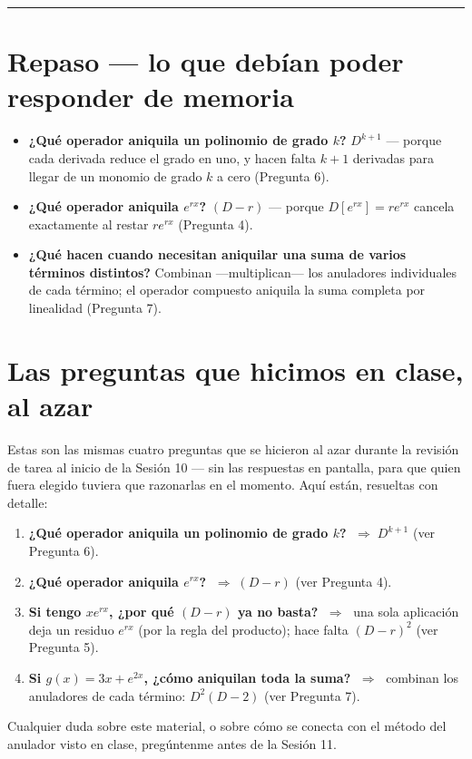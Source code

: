\documentclass[11pt]{article}
\begin{document}
\vspace{0.4em}
\hrule
\vspace{0.8em}

\section*{Repaso — lo que debían poder responder de memoria}

\begin{memoria}
\begin{itemize}[itemsep=0.4em]
  \item \textbf{¿Qué operador aniquila un polinomio de grado $k$?} $D^{k+1}$ — porque cada derivada reduce el grado en uno, y hacen falta $k+1$ derivadas para llegar de un monomio de grado $k$ a cero (Pregunta 6).
  \item \textbf{¿Qué operador aniquila $e^{rx}$?} $(D-r)$ — porque $D[e^{rx}]=re^{rx}$ cancela exactamente al restar $re^{rx}$ (Pregunta 4).
  \item \textbf{¿Qué hacen cuando necesitan aniquilar una suma de varios términos distintos?} Combinan —multiplican— los anuladores individuales de cada término; el operador compuesto aniquila la suma completa por linealidad (Pregunta 7).
\end{itemize}
\end{memoria}

\section*{Las preguntas que hicimos en clase, al azar}

Estas son las mismas cuatro preguntas que se hicieron al azar durante la revisión de tarea al inicio de la Sesión 10 — sin las respuestas en pantalla, para que quien fuera elegido tuviera que razonarlas en el momento. Aquí están, resueltas con detalle:

\begin{clase}
\begin{enumerate}[itemsep=0.6em, leftmargin=1.6em]
  \item \textbf{¿Qué operador aniquila un polinomio de grado $k$?} $\;\Rightarrow\; D^{k+1}$ (ver Pregunta 6).
  \item \textbf{¿Qué operador aniquila $e^{rx}$?} $\;\Rightarrow\; (D-r)$ (ver Pregunta 4).
  \item \textbf{Si tengo $xe^{rx}$, ¿por qué $(D-r)$ ya no basta?} $\;\Rightarrow\;$ una sola aplicación deja un residuo $e^{rx}$ (por la regla del producto); hace falta $(D-r)^2$ (ver Pregunta 5).
  \item \textbf{Si $g(x)=3x+e^{2x}$, ¿cómo aniquilan toda la suma?} $\;\Rightarrow\;$ combinan los anuladores de cada término: $D^2(D-2)$ (ver Pregunta 7).
\end{enumerate}
\end{clase}

\vspace{1em}
\noindent\small\color{slate}
Cualquier duda sobre este material, o sobre cómo se conecta con el método del anulador visto en clase, pregúntenme antes de la Sesión 11.
\end{document}
